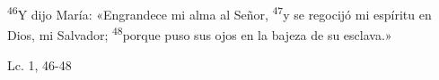 \documentclass[../../rosario.tex]{subfiles}
\begin{document}
    \textsuperscript{46}Y dijo María: «Engrandece mi alma al Señor, \textsuperscript{47}y se regocijó mi espíritu en Dios, mi Salvador;
    \textsuperscript{48}porque puso sus ojos en la bajeza de su esclava.»
    \begin{flushright}
    Lc. 1, 46-48        
    \end{flushright}
\end{document}
